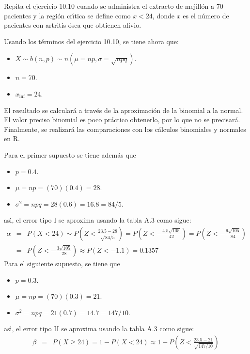 \begin{enunciado}
 Repita el ejercicio 10.10 cuando se administra el extracto de mejill\'on a $70$ pacientes y la regi\'on cr\'{\i}tica se define como $x < 24$, donde $x$ es el n\'umero de pacientes con artritis \'osea que obtienen alivio.
\end{enunciado}

\begin{solucion}
 Usando los t\'erminos del ejercicio 10.10, se tiene ahora que:
 \begin{itemize}
  \item $X \sim b(n,p) \sim n\left( \mu = np, \sigma = \sqrt{npq} \right)$.
  \item $n = 70$.
  \item $x_{\text{inf}} = 24$.
 \end{itemize}
 El resultado se calcular\'a a trav\'es de la aproximaci\'on de la binomial a la normal. El valor preciso binomial es poco pr\'actico obtenerlo, por lo que no se precisar\'a. Finalmente, se realizar\'a las comparaciones con los c\'alculos binomiales y normales en R.
 \par 
 Para el primer supuesto se tiene adem\'as que
 \begin{itemize}
  \item $p = 0.4$.
  \item $\mu = np = (70)(0.4) = 28$.
  \item $\sigma^2 = npq = 28(0.6) = 16.8 = 84/5$.
 \end{itemize}
 as\'{\i}, el error tipo I se aproxima usando la tabla A.3 como sigue:
 \begin{eqnarray*}
  \alpha & = & P(X < 24) \sim P\left( Z < \frac{23.5 - 28}{\sqrt{84/5}} \right) = P\left( Z < -\frac{4.5\sqrt{105}}{42} \right) = P\left( Z < -\frac{9\sqrt{105}}{84} \right) \\
  & = & P\left( Z < -\frac{3\sqrt{105}}{28} \right) \approx P(Z < -1.1) = 0.1357
 \end{eqnarray*}
 Para el siguiente supuesto, se tiene que
 \begin{itemize}
  \item $p = 0.3$.
  \item $\mu = np = (70)(0.3) = 21$.
  \item $\sigma^2 = npq = 21(0.7) = 14.7 = 147/10$.
 \end{itemize}
 as\'{\i}, el error tipo II se aproxima usando la tabla A.3 como sigue:
 \begin{eqnarray*}
  \beta & = & P(X \geq 24) = 1 - P(X < 24) \approx 1 - P\left( Z < \frac{23.5 - 21}{\sqrt{147/10}} \right) \\

\end{eqnarray*}
\end{solucion}
